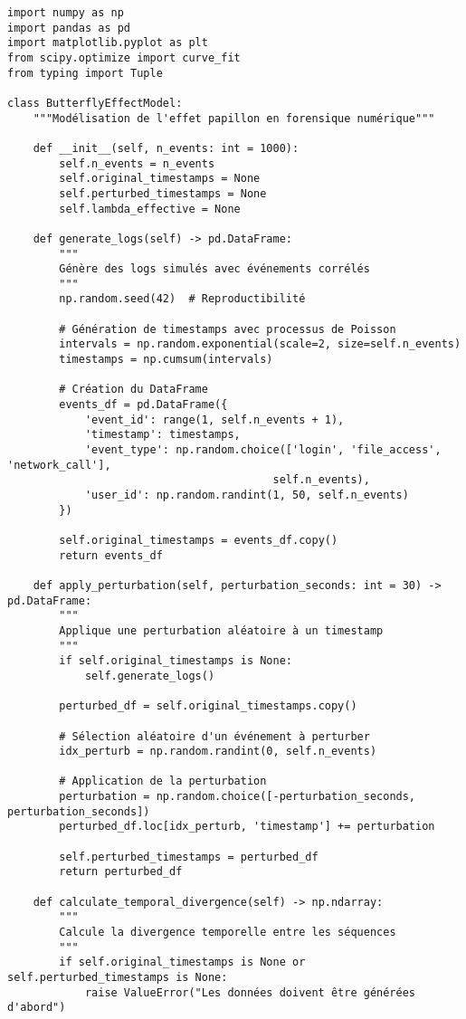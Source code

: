 \documentclass[12pt,a4paper]{article}
\begin{document}
\begin{lstlisting}[caption=Modélisation de l'effet papillon forensique]
import numpy as np
import pandas as pd
import matplotlib.pyplot as plt
from scipy.optimize import curve_fit
from typing import Tuple

class ButterflyEffectModel:
    """Modélisation de l'effet papillon en forensique numérique"""
    
    def __init__(self, n_events: int = 1000):
        self.n_events = n_events
        self.original_timestamps = None
        self.perturbed_timestamps = None
        self.lambda_effective = None
        
    def generate_logs(self) -> pd.DataFrame:
        """
        Génère des logs simulés avec événements corrélés
        """
        np.random.seed(42)  # Reproductibilité
        
        # Génération de timestamps avec processus de Poisson
        intervals = np.random.exponential(scale=2, size=self.n_events)
        timestamps = np.cumsum(intervals)
        
        # Création du DataFrame
        events_df = pd.DataFrame({
            'event_id': range(1, self.n_events + 1),
            'timestamp': timestamps,
            'event_type': np.random.choice(['login', 'file_access', 'network_call'], 
                                         self.n_events),
            'user_id': np.random.randint(1, 50, self.n_events)
        })
        
        self.original_timestamps = events_df.copy()
        return events_df
    
    def apply_perturbation(self, perturbation_seconds: int = 30) -> pd.DataFrame:
        """
        Applique une perturbation aléatoire à un timestamp
        """
        if self.original_timestamps is None:
            self.generate_logs()
            
        perturbed_df = self.original_timestamps.copy()
        
        # Sélection aléatoire d'un événement à perturber
        idx_perturb = np.random.randint(0, self.n_events)
        
        # Application de la perturbation
        perturbation = np.random.choice([-perturbation_seconds, perturbation_seconds])
        perturbed_df.loc[idx_perturb, 'timestamp'] += perturbation
        
        self.perturbed_timestamps = perturbed_df
        return perturbed_df
    
    def calculate_temporal_divergence(self) -> np.ndarray:
        """
        Calcule la divergence temporelle entre les séquences
        """
        if self.original_timestamps is None or self.perturbed_timestamps is None:
            raise ValueError("Les données doivent être générées d'abord")
            

\end{lstlisting}
\end{document}
